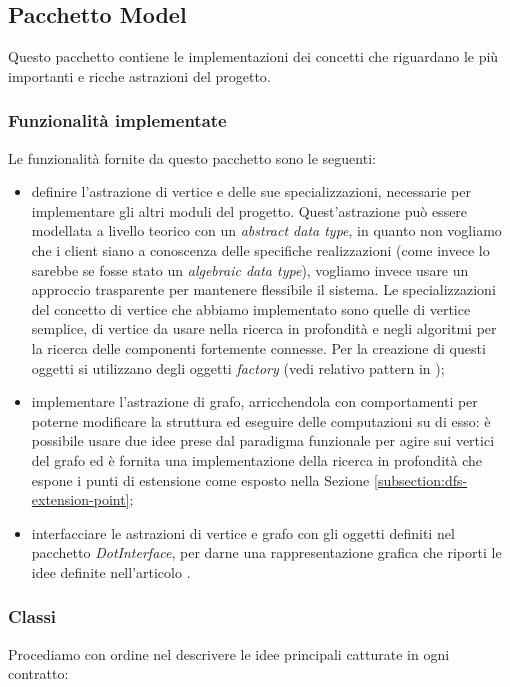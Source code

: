 \subsection{Pacchetto Model}
\label{subsection:model-package-description}
Questo pacchetto contiene le implementazioni dei concetti che riguardano
le pi\`u importanti e ricche astrazioni del progetto.

\subsubsection*{Funzionalit\`a implementate}
\label{subsection:model-supplied-abstractions}
Le funzionalit\`a fornite da questo pacchetto sono le seguenti:
\begin{itemize}
\label{itemize:model-supplied-abstraction}
\item definire l'astrazione di vertice e delle sue specializzazioni,
  necessarie per implementare gli altri moduli del
  progetto. Quest'astrazione pu\`o essere modellata a livello teorico
  con un \emph{abstract data type}, in quanto non vogliamo che i
  client siano a conoscenza delle specifiche realizzazioni (come
  invece lo sarebbe se fosse stato un \emph{algebraic data type}),
  vogliamo invece usare un approccio trasparente per mantenere
  flessibile il sistema. Le specializzazioni del concetto di vertice
  che abbiamo implementato sono quelle di vertice semplice, di vertice
  da usare nella ricerca in profondit\`a e negli algoritmi per la
  ricerca delle componenti fortemente connesse. Per la creazione di
  questi oggetti si utilizzano degli oggetti \emph{factory} (vedi
  relativo pattern in \cite{SmalltalkCompanion98});
\item implementare l'astrazione di grafo, arricchendola con
  comportamenti per poterne modificare la struttura ed eseguire delle
  computazioni su di esso: \`e possibile usare due idee prese dal
  paradigma funzionale per agire sui vertici del grafo ed \`e fornita
  una implementazione della ricerca in profondit\`a che espone i punti
  di estensione come esposto nella Sezione
  \ref{subsection:dfs-extension-point};
\item interfacciare le astrazioni di vertice e grafo con gli oggetti
  definiti nel pacchetto \emph{DotInterface}, per darne una
  rappresentazione grafica che riporti le idee definite nell'articolo
  \cite{tellingStories}.
\end{itemize}

\subsubsection*{Classi}
Procediamo con ordine nel descrivere le idee principali catturate in
ogni contratto:

